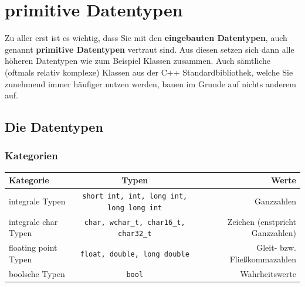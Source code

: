 \documentclass[a4paper]{report}
\begin{document}
\section{primitive Datentypen}
Zu aller erst ist es wichtig, dass Sie mit den \textbf{eingebauten Datentypen}, auch genannt \textbf{primitive Datentypen} vertraut sind. Aus diesen setzen sich dann alle höheren Datentypen wie zum Beispiel Klassen zusammen. Auch sämtliche (oftmals relativ komplexe) Klassen aus der C++ Standardbibliothek, welche Sie zunehmend immer häufiger nutzen werden, bauen im Grunde auf nichts anderem auf.

\subsection{Die Datentypen}

\subsubsection{Kategorien}
 \begin{center}
\begin{tabular}{|l|c|r|}
	\hline
	\textbf{Kategorie} & \textbf{Typen} & \textbf{Werte}\\ \hline 
	integrale Typen & \texttt{short int, int, long int, long long int} & Ganzzahlen \\ 
	integrale char Typen & \texttt{char, wchar\_t, char16\_t, char32\_t} & Zeichen (enstpricht Ganzzahlen) \\
	floating point Typen & \texttt{float, double, long double} & Gleit- bzw. Fließkommazahlen \\
	boolsche Typen & \texttt{bool} & Wahrheitswerte \\ \hline
\end{tabular}
\end{center}
\end{document}
